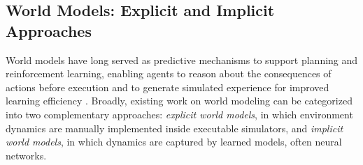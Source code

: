 


\subsection{World Models: Explicit and Implicit Approaches}

World models have long served as predictive mechanisms to support planning and reinforcement learning, enabling agents to reason about the consequences of actions before execution and to generate simulated experience for improved learning efficiency \cite{ha2018recurrent}. Broadly, existing work on world modeling can be categorized into two complementary approaches: \emph{explicit world models}, in which environment dynamics are manually implemented inside executable simulators, and \emph{implicit world models}, in which dynamics are captured by learned models, often neural networks.

